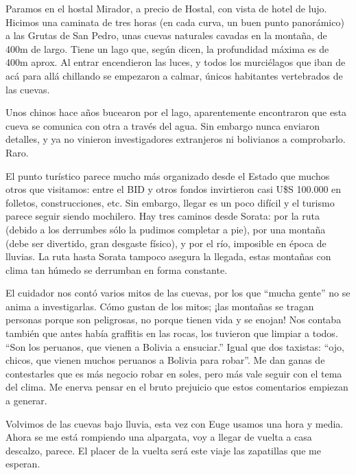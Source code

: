 Paramos en el hostal Mirador, a precio de Hostal, con vista de hotel de lujo.
Hicimos una caminata de tres horas (en cada curva, un buen punto panorámico) a
las Grutas de San Pedro, unas cuevas naturales cavadas en la montaña, de 400m
de largo. Tiene un lago que, según dicen, la profundidad máxima es de 400m
aprox. Al entrar encendieron las luces, y todos los murciélagos que iban de
acá para allá chillando se empezaron a calmar, únicos habitantes vertebrados
de las cuevas.

Unos chinos hace años bucearon por el lago, aparentemente encontraron que esta
cueva se comunica con otra a través del agua. Sin embargo nunca enviaron
detalles, y ya no vinieron investigadores extranjeros ni bolivianos a
comprobarlo. Raro.

El punto turístico parece mucho más organizado desde el Estado que muchos
otros que visitamos: entre el BID y otros fondos invirtieron casi U\$S 100.000
en folletos, construcciones, etc. Sin embargo, llegar es un poco difícil y el
turismo parece seguir siendo mochilero. Hay tres caminos desde Sorata: por la
ruta (debido a los derrumbes sólo la pudimos completar a pie), por una
montaña (debe ser divertido, gran desgaste físico), y por el río, imposible
en época de lluvias. La ruta hasta Sorata tampoco asegura la llegada, estas
montañas con clima tan húmedo se derrumban en forma constante.

El cuidador nos contó varios mitos de las cuevas, por los que
``mucha gente'' no se anima a investigarlas. Cómo gustan de los mitos;
¡las montañas se tragan personas porque son peligrosas, no
porque tienen vida y se enojan! Nos contaba también que antes había graffitis
en las rocas, los tuvieron que limpiar a todos. ``Son los peruanos, que vienen a
Bolivia a ensuciar.'' Igual que dos taxistas: ``ojo, chicos, que vienen muchos
peruanos a Bolivia para robar''. Me dan ganas de contestarles que es más
negocio robar en soles, pero más vale seguir con el tema del clima. Me enerva
pensar en el bruto prejuicio que estos comentarios empiezan a generar.

Volvimos de las cuevas bajo lluvia, esta vez con Euge usamos una hora y media.
Ahora se me está rompiendo una alpargata, voy a llegar de vuelta a casa
descalzo, parece. El placer de la vuelta será este viaje las zapatillas que me
esperan.

